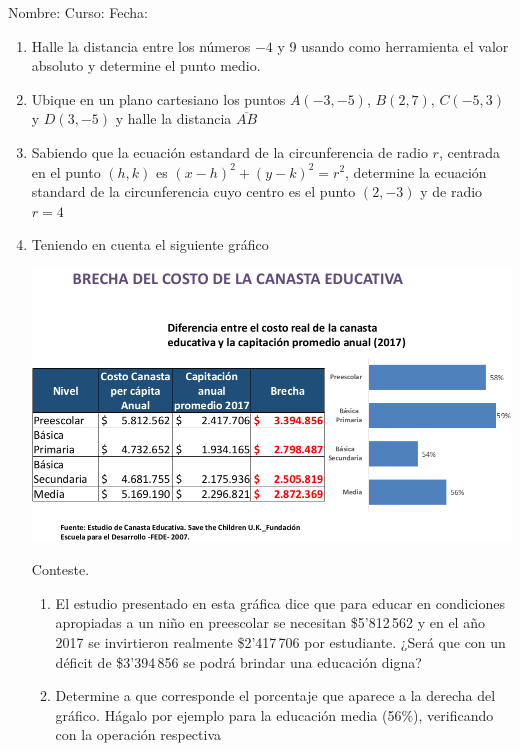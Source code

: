 \documentclass[fleqn]{article}
\newcommand{\LineaNombre}{%
\par
\vspace{\baselineskip}
Nombre:\hrulefill \; Curso: \underline{\hspace*{48pt}} \; Fecha: \underline{\hspace*{2.5cm}} \relax
\par}
\begin{document}
\LineaNombre
\begin{enumerate}
 \item Halle la distancia entre los números $-4$ y 9 usando como herramienta el valor absoluto y determine el punto medio.\noanswer
 \item Ubique en un plano cartesiano los puntos $A(-3,-5)$, $B(2,7)$, $C(-5,3)$ y $D(3,-5)$ y halle la distancia $\overline{AB}$
  \item Sabiendo que la ecuación estandard de la circunferencia de radio $r$, centrada en el punto $(h,k)$ es $(x-h)^{2}+(y-k)^{2}=r^{2}$, determine la ecuación standard de la circunferencia cuyo centro es el punto $(2,-3)$ y de radio $r=4$ \noanswer
 \item Teniendo en cuenta el siguiente gráfico
 \begin{center}
 \includegraphics[scale=.375]{Images/BrechaCanasta.png} 
 \end{center}
 Conteste.
 \begin{enumerate}
 \item El estudio presentado en esta gráfica dice que para educar en condiciones apropiadas a un niño en preescolar se necesitan \$5'812\,562 y en el año 2017 se invirtieron realmente \$2'417\,706 por estudiante. ¿Será que con un déficit de \$3'394\,856 se podrá brindar una educación digna?
 \item Determine a que corresponde el porcentaje que aparece a la derecha del gráfico. Hágalo por ejemplo para la educación media (56\%), verificando con la operación respectiva \noanswer

\end{enumerate}
\end{enumerate}
\end{document}
